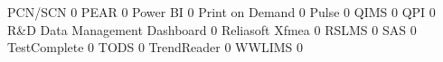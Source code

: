 \documentclass{article}
\begin{document}
\begin{Schunk}
\begin{Soutput}
  PCN/SCN                                                                   0
  PEAR                                                                      0
  Power BI                                                                  0
  Print on Demand                                                           0
  Pulse                                                                     0
  QIMS                                                                      0
  QPI                                                                       0
  R&D Data Management Dashboard                                             0
  Reliasoft Xfmea                                                           0
  RSLMS                                                                     0
  SAS                                                                       0
  TestComplete                                                              0
  TODS                                                                      0
  TrendReader                                                               0
  WWLIMS                                                                    0
                                                           

\end{Soutput}
\end{Schunk}
\end{document}
